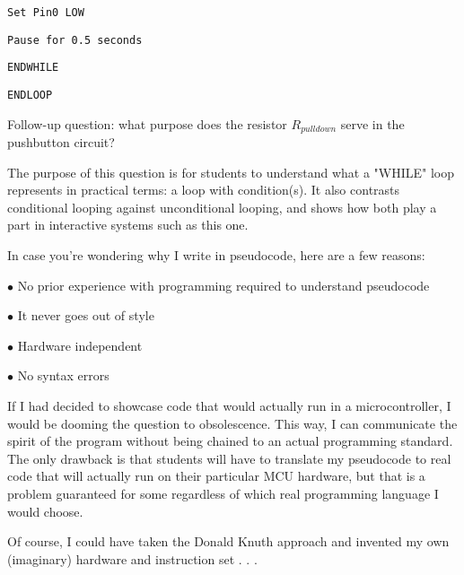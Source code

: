 \hskip 20pt {\tt Set Pin0 LOW}

\hskip 20pt {\tt Pause for 0.5 seconds}

\hskip 10pt {\tt ENDWHILE}

{\tt ENDLOOP}

\vskip 10pt

Follow-up question: what purpose does the resistor $R_{pulldown}$ serve in the pushbutton circuit?







The purpose of this question is for students to understand what a "WHILE" loop represents in practical terms: a loop with condition(s).  It also contrasts conditional looping against unconditional looping, and shows how both play a part in interactive systems such as this one.

\vskip 10pt

In case you're wondering why I write in pseudocode, here are a few reasons:

\medskip
\goodbreak
\item{$\bullet$} No prior experience with programming required to understand pseudocode
\item{$\bullet$} It never goes out of style
\item{$\bullet$} Hardware independent
\item{$\bullet$} No syntax errors
\medskip

If I had decided to showcase code that would actually run in a microcontroller, I would be dooming the question to obsolescence.  This way, I can communicate the spirit of the program without being chained to an actual programming standard.  The only drawback is that students will have to translate my pseudocode to real code that will actually run on their particular MCU hardware, but that is a problem guaranteed for some regardless of which real programming language I would choose.

Of course, I could have taken the Donald Knuth approach and invented my own (imaginary) hardware and instruction set . . . 




